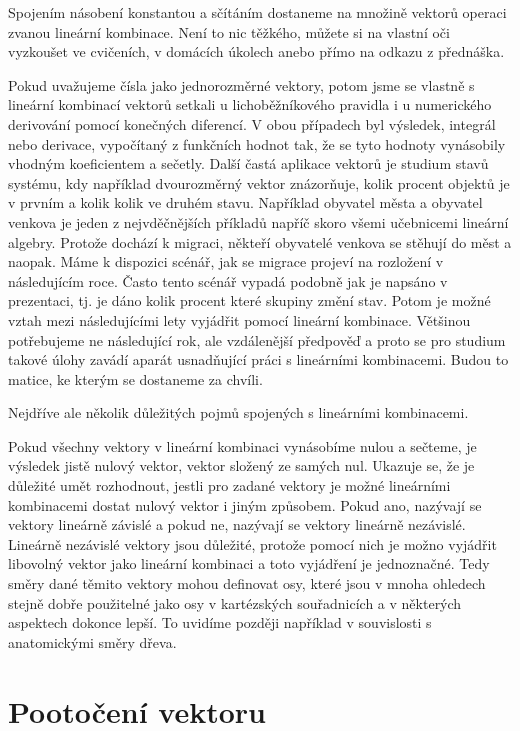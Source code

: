 \documentclass[12pt]{article}
\begin{document}
Spojením násobení konstantou a sčítáním dostaneme na množině vektorů operaci zvanou lineární kombinace. Není to nic těžkého, můžete si na vlastní oči vyzkoušet ve cvičeních, v domácích úkolech anebo přímo na odkazu z přednáška.

Pokud uvažujeme čísla jako jednorozměrné vektory, potom jsme se vlastně s lineární kombinací vektorů setkali u lichoběžníkového pravidla i u numerického derivování pomocí konečných diferencí. V obou případech byl výsledek, integrál nebo derivace, vypočítaný z funkčních hodnot tak, že se tyto hodnoty vynásobily vhodným koeficientem a sečetly. Další častá aplikace vektorů je studium stavů systému, kdy například dvourozměrný vektor znázorňuje, kolik procent objektů je v prvním a kolik kolik ve druhém stavu. Například obyvatel města a obyvatel venkova je jeden z nejvděčnějších příkladů napříč skoro všemi učebnicemi lineární algebry. Protože dochází k migraci, někteří obyvatelé venkova se stěhují do měst a naopak. Máme k dispozici scénář, jak se migrace projeví na rozložení v následujícím roce. Často tento scénář vypadá podobně jak je napsáno v prezentaci, tj. je dáno kolik procent které skupiny změní stav. Potom je možné vztah mezi následujícími lety vyjádřit pomocí lineární kombinace. Většinou potřebujeme ne následující rok, ale vzdálenější předpověď a proto se pro studium takové úlohy zavádí aparát usnadňující práci s lineárními kombinacemi. Budou to matice, ke kterým se dostaneme za chvíli.

Nejdříve ale několik důležitých pojmů spojených s lineárními kombinacemi. 

Pokud všechny vektory v lineární kombinaci vynásobíme nulou a sečteme, je výsledek jistě nulový vektor, vektor složený ze samých nul. Ukazuje se, že je důležité umět rozhodnout, jestli pro zadané vektory je možné lineárními kombinacemi dostat  nulový vektor i jiným způsobem. Pokud ano, nazývají se vektory lineárně závislé a pokud ne, nazývají se vektory lineárně nezávislé. Lineárně nezávislé vektory jsou důležité, protože pomocí nich je možno vyjádřit libovolný vektor jako lineární kombinaci a toto vyjádření je jednoznačné. Tedy směry dané těmito vektory mohou definovat osy, které jsou v mnoha ohledech stejně dobře použitelné jako osy v kartézských souřadnicích a v některých aspektech dokonce lepší. To uvidíme později například v souvislosti s anatomickými směry dřeva.  

\section{Pootočení vektoru}
\end{document}
